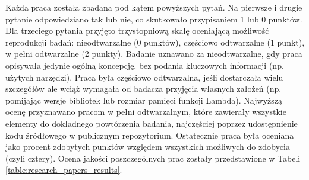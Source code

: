 Każda praca została zbadana pod kątem powyższych pytań.
Na pierwsze i drugie pytanie odpowiedziano tak lub nie, co skutkowało przypisaniem 1 lub 0 punktów.
Dla trzeciego pytania przyjęto trzystopniową skalę oceniającą możliwość reprodukcji badań: nieodtwarzalne (0 punktów), częściowo odtwarzalne (1 punkt), w pełni odtwarzalne (2 punkty).
Badanie uznawano za nieodtwarzalne, gdy praca opisywała jedynie ogólną koncepcję, bez podania kluczowych informacji (np. użytych narzędzi).
Praca była częściowo odtwarzalna, jeśli dostarczała wielu szczegółów ale wciąż wymagała od badacza przyjęcia własnych założeń (np. pomijając wersje bibliotek lub rozmiar pamięci funkcji Lambda).
Najwyższą ocenę przyznawano pracom w pełni odtwarzalnym, które zawierały wszystkie elementy do dokładnego powtórzenia badania, najczęściej poprzez udostępnienie kodu źródłowego w publicznym repozytorium.
Ostatecznie praca była oceniana jako procent zdobytych punktów względem wszystkich możliwych do zdobycia (czyli cztery).
Ocena jakości poszczególnych prac zostały przedstawione w Tabeli \ref{table:research_papers_results}.
